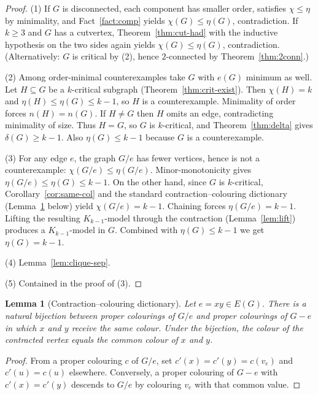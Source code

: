 \documentclass[11pt]{article}
\newtheorem{lemma}[theorem]{Lemma}
\theoremstyle{definition}
\newcommand{\had}{\eta}
\begin{document}
\begin{proof}
(1) If \(G\) is disconnected, each component has smaller order, satisfies
\(\chi\le\had\) by minimality, and Fact~\ref{fact:comp} yields
\(\chi(G)\le\had(G)\), contradiction. If \(k\ge 3\) and \(G\) has a cutvertex,
Theorem~\ref{thm:cut-had} with the inductive hypothesis on the two sides again
yields \(\chi(G)\le\had(G)\), contradiction. (Alternatively: \(G\) is critical
by (2), hence \(2\)-connected by Theorem~\ref{thm:2conn}.)

(2) Among order-minimal counterexamples take \(G\) with \(e(G)\) minimum as
well. Let \(H\subseteq G\) be a \(k\)-critical subgraph
(Theorem~\ref{thm:crit-exist}). Then \(\chi(H)=k\) and
\(\had(H)\le\had(G)\le k-1\), so \(H\) is a counterexample. Minimality of order
forces \(n(H)=n(G)\). If \(H\neq G\) then \(H\) omits an edge, contradicting
minimality of size. Thus \(H=G\), so \(G\) is \(k\)-critical, and
Theorem~\ref{thm:delta} gives \(\delta(G)\ge k-1\). Also \(\had(G)\le k-1\)
because \(G\) is a counterexample.

(3) For any edge \(e\), the graph \(G/e\) has fewer vertices, hence is not a
counterexample: \(\chi(G/e)\le\had(G/e)\). Minor-monotonicity gives
\(\had(G/e)\le\had(G)\le k-1\). On the other hand, since \(G\) is \(k\)-critical,
Corollary~\ref{cor:same-col} and the standard contraction--colouring dictionary
(Lemma~\ref{lem:contr-col} below) yield \(\chi(G/e)=k-1\). Chaining forces
\(\had(G/e)=k-1\). Lifting the resulting \(K_{k-1}\)-model through the
contraction (Lemma~\ref{lem:lift}) produces a \(K_{k-1}\)-model in \(G\).
Combined with \(\had(G)\le k-1\) we get \(\had(G)=k-1\).

(4) Lemma~\ref{lem:clique-sep}.

(5) Contained in the proof of (3).
\end{proof}

\begin{lemma}[Contraction--colouring dictionary]\label{lem:contr-col}
Let \(e=xy\in E(G)\). There is a natural bijection between proper colourings of
\(G/e\) and proper colourings of \(G-e\) in which \(x\) and \(y\) receive the
same colour. Under the bijection, the colour of the contracted vertex equals
the common colour of \(x\) and \(y\).
\end{lemma}

\begin{proof}
From a proper colouring \(c\) of \(G/e\), set \(c'(x)=c'(y)=c(v_e)\) and
\(c'(u)=c(u)\) elsewhere. Conversely, a proper colouring of \(G-e\) with
\(c'(x)=c'(y)\) descends to \(G/e\) by colouring \(v_e\) with that common value.
\end{proof}
\end{document}
